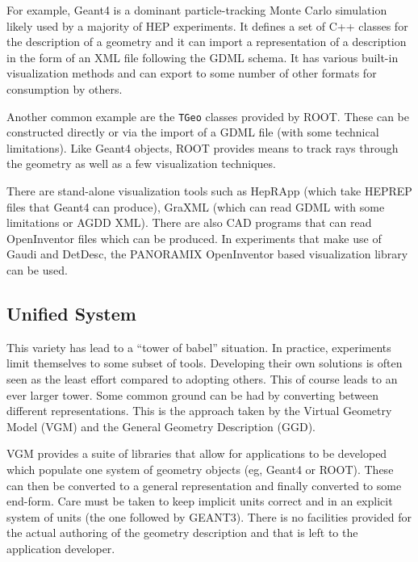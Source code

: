 For example, Geant4 is a dominant particle-tracking Monte Carlo
simulation likely used by a majority of HEP experiments.  It defines a
set of C++ classes for the description of a geometry and it can import
a representation of a description in the form of an XML file following
the GDML schema.  It has various built-in visualization methods and
can export to some number of other formats for consumption by others.

Another common example are the \texttt{TGeo} classes provided by ROOT.
These can be constructed directly or via the import of a GDML file
(with some technical limitations).  Like Geant4 objects, ROOT provides
means to track rays through the geometry as well as a few
visualization techniques.

There are stand-alone visualization tools such as HepRApp (which take
HEPREP files that Geant4 can produce), GraXML (which can read GDML
with some limitations or AGDD XML).  There are also CAD programs that
can read OpenInventor files which can be produced.  In experiments
that make use of Gaudi and DetDesc, the PANORAMIX OpenInventor based
visualization library can be used.

\subsection{Unified System}

This variety has lead to a ``tower of babel'' situation.  In practice,
experiments limit themselves to some subset of tools.  Developing
their own solutions is often seen as the least effort compared to
adopting others.  This of course leads to an ever larger tower.  Some
common ground can be had by converting between different
representations.  This is the approach taken by the Virtual Geometry
Model (VGM) and the General Geometry Description (GGD).

VGM provides a suite of libraries that allow for applications to be
developed which populate one system of geometry objects (eg, Geant4 or
ROOT).  These can then be converted to a general representation and
finally converted to some end-form.  Care must be taken to keep
implicit units correct and in an explicit system of units (the one
followed by GEANT3).  There is no facilities provided for the actual
authoring of the geometry description and that is left to the
application developer.

